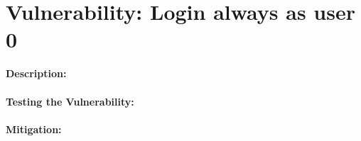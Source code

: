 \section{Vulnerability: Login always as user 0}
\label{sec:background}
\textbf{Description:} \\ \\
\textbf{Testing the Vulnerability:} \\ \\
\textbf{Mitigation:} 
